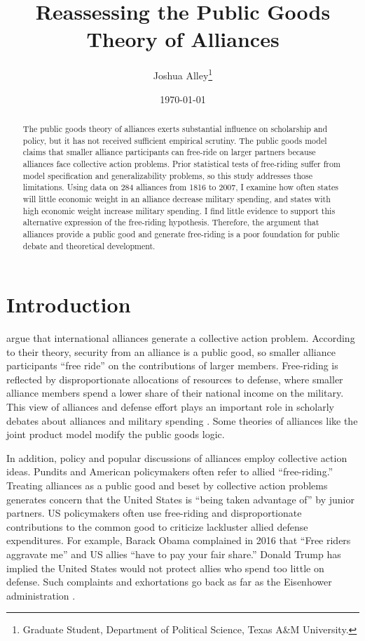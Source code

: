 \documentclass[12pt]{article}
\title{
\textbf{Reassessing the Public Goods Theory of Alliances}
	}
\author{Joshua Alley\footnote{Graduate Student,
Department of Political Science, Texas A\&M University.}}
\date{{\normalsize \today}}
\begin{document}
\maketitle 

\doublespace

\begin{abstract}
The public goods theory of alliances exerts substantial influence on scholarship and policy, but it has not received sufficient empirical scrutiny. 
The public goods model claims that smaller alliance participants can free-ride on larger partners because alliances face collective action problems. 
Prior statistical tests of free-riding suffer from model specification and generalizability problems, so this study addresses those limitations. 
Using data on 284 alliances from 1816 to 2007, I examine how often states will little economic weight in an alliance decrease military spending, and states with high economic weight increase military spending. 
I find little evidence to support this alternative expression of the free-riding hypothesis. 
Therefore, the argument that alliances provide a public good and generate free-riding is a poor foundation for public debate and theoretical development. 
\end{abstract} 

\newpage


\section{Introduction}



\citet{OlsonZeckhauser1966} argue that international alliances generate a collective action problem. 
According to their theory, security from an alliance is a public good, so smaller alliance participants ``free ride'' on the contributions of larger members. 
Free-riding is reflected by disproportionate allocations of resources to defense, where smaller alliance members spend a lower share of their national income on the military.
This view of alliances and defense effort plays an important role in scholarly debates about alliances and military spending \citep{Walt1990, Mearsheimer1994, Goldstein1995, SandlerHartley2001, Garfinkel2004, Walt2009, Norrlof2010, Barrett2010, PluemperNeumayer2015}. 
Some theories of alliances like the joint product model \citep{Sandler1993} modify the public goods logic. 


In addition, policy and popular discussions of alliances employ collective action ideas.
Pundits and American policymakers often refer to allied ``free-riding.'' 
Treating alliances as a public good and beset by collective action problems generates concern that the United States is ``being taken advantage of'' by junior partners. 
US policymakers often use free-riding and disproportionate contributions to the common good to criticize lackluster allied defense expenditures.  
For example, Barack Obama complained in 2016 that ``Free riders aggravate me'' and US allies ``have to pay your fair share.'' 
Donald Trump has implied the United States would not protect allies who spend too little on defense. 
Such complaints and exhortations go back as far as the Eisenhower administration \citep{Lanoszka2015}.
\end{document}
